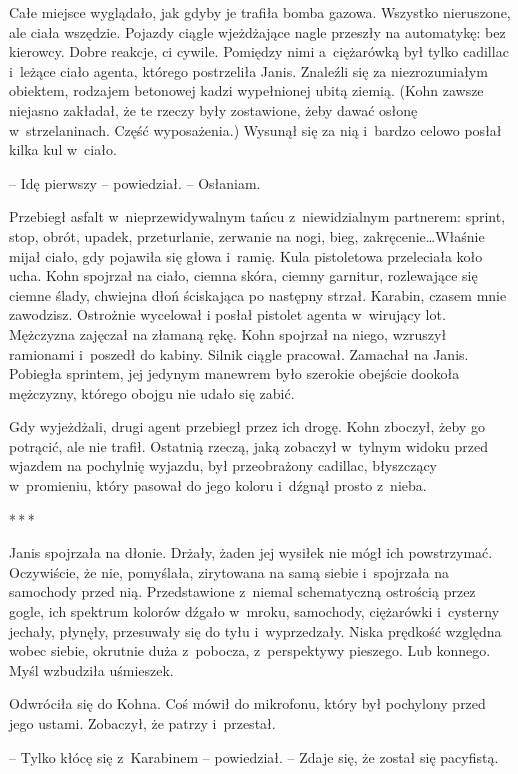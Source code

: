 \documentclass[oneside,polish,11pt,sfheadings]{mwbk}
\newcommand{\threeast}{\bigskip\par\centerline{*\,*\,*}\medskip\par}%
\begin{document}
Całe miejsce wyglądało, jak gdyby je trafiła bomba gazowa. Wszystko
nieruszone, ale ciała wszędzie. Pojazdy ciągle wjeżdżające nagle
przeszły na automatykę: bez kierowcy. Dobre reakcje, ci cywile. Pomiędzy
nimi a~ciężarówką był tylko cadillac i~leżące ciało agenta, którego
postrzeliła Janis. Znaleźli się za niezrozumiałym obiektem, rodzajem
betonowej kadzi wypełnionej ubitą ziemią. (Kohn zawsze niejasno
zakładał, że te rzeczy były zostawione, żeby dawać osłonę w~strzelaninach. Część wyposażenia.) Wysunął się za nią i~bardzo celowo
posłał kilka kul w~ciało.

-- Idę pierwszy -- powiedział. -- Osłaniam.

Przebiegł asfalt w~nieprzewidywalnym tańcu z~niewidzialnym partnerem:
sprint, stop, obrót, upadek, przeturlanie, zerwanie na nogi, bieg,
zakręcenie\ldots Właśnie mijał ciało, gdy pojawiła się głowa i~ramię. Kula
pistoletowa przeleciała koło ucha. Kohn spojrzał na ciało, ciemna skóra,
ciemny garnitur, rozlewające się ciemne ślady, chwiejna dłoń ściskająca
po następny strzał. Karabin, czasem mnie zawodzisz. Ostrożnie wycelował
i posłał pistolet agenta w~wirujący lot. Mężczyzna zajęczał na złamaną
rękę. Kohn spojrzał na niego, wzruszył ramionami i~poszedł do kabiny.
Silnik ciągle pracował. Zamachał na Janis. Pobiegła sprintem, jej
jedynym manewrem było szerokie obejście dookoła mężczyzny, którego
obojgu nie udało się zabić.

Gdy wyjeżdżali, drugi agent przebiegł przez ich drogę. Kohn zboczył,
żeby go potrącić, ale nie trafił. Ostatnią rzeczą, jaką zobaczył w~tylnym widoku przed wjazdem na pochylnię wyjazdu, był przeobrażony
cadillac, błyszczący w~promieniu, który pasował do jego koloru i~dźgnął
prosto z~nieba.
  \threeast 

Janis spojrzała na dłonie. Drżały, żaden jej wysiłek nie mógł ich
powstrzymać. Oczywiście, że nie, pomyślała, zirytowana na samą siebie i~spojrzała na samochody przed nią. Przedstawione z~niemal schematyczną
ostrością przez gogle, ich spektrum kolorów dźgało w~mroku, samochody,
ciężarówki i~cysterny jechały, płynęły, przesuwały się do tyłu i~wyprzedzały. Niska prędkość względna wobec siebie, okrutnie duża z~pobocza, z~perspektywy pieszego. Lub konnego. Myśl wzbudziła uśmieszek.

Odwróciła się do Kohna. Coś mówił do mikrofonu, który był pochylony
przed jego ustami. Zobaczył, że patrzy i~przestał.

-- Tylko kłócę się z~Karabinem -- powiedział. -- Zdaje się, że został się
pacyfistą.
\end{document}
